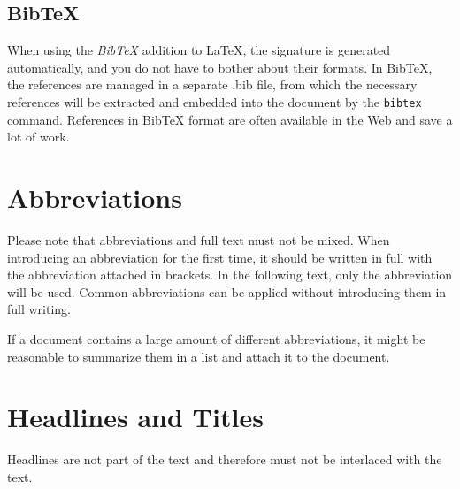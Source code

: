 \subsection{BibTeX}

When using the \emph{BibTeX} addition to LaTeX, the signature is generated
automatically, and you do not have to bother about their formats. In BibTeX,
the references are managed in a separate .bib file, from which the necessary
references will be extracted and embedded into the document by the \texttt{bibtex}
command. References in BibTeX format are often available in the Web and save
a lot of work.


\section{Abbreviations}

Please note that abbreviations and full text must not be mixed. When introducing
an abbreviation for the first time, it should be written in full with the 
abbreviation attached in brackets. In the following text, only the abbreviation will
be used. Common abbreviations can be applied without introducing them in full
writing.

\begin{quotation}
\end{quotation}

If a document contains a large amount of different abbreviations, it might be
reasonable to summarize them in a list and attach it to the document.


\section{Headlines and Titles}

Headlines are not part of the text and therefore must not be interlaced with the text. 



